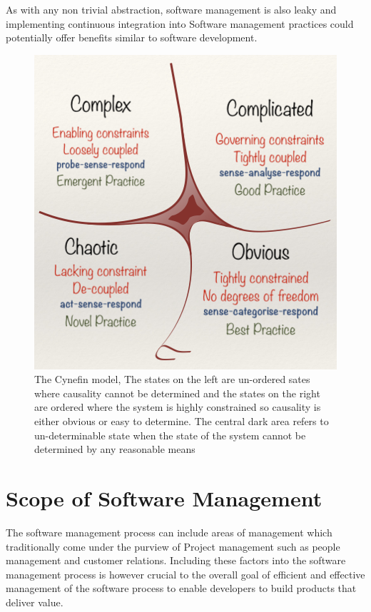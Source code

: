\documentclass[12pt,conference]{IEEEtran}
\begin{document}
As with any non trivial abstraction, software management is also leaky and implementing continuous integration into Software management practices could potentially offer benefits similar to software development.

\begin{figure}[hbtp]
\includegraphics[scale=0.55]{cynefin.png}
\caption{The Cynefin model, The states on the left are un-ordered sates where causality cannot be determined and the states on the right are ordered where the system is highly constrained so causality is either obvious or easy to determine. The central dark area refers to un-determinable state when the state of the system cannot be determined by any reasonable means  \cite{snowden_leaders_2007}}
\label{cynefin}
\end{figure}


\section*{Scope of Software Management}

The software management process can include areas of management which traditionally come under the purview of Project management such as people management and customer relations. Including these factors into the software management process is however crucial to the overall goal of efficient and effective management of the software process to enable developers to build products that deliver value.
\end{document}

